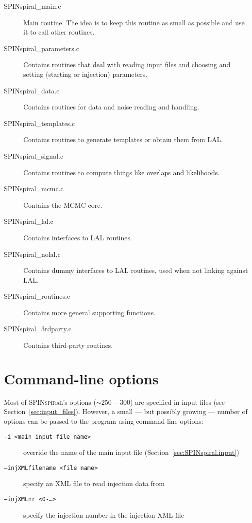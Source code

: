 \documentclass[10pt]{article}
\begin{document}
\begin{description}
\item[SPINspiral\_main.c] Main routine. The idea is to keep this routine as small as possible and use it to call other routines.
\item[SPINspiral\_parameters.c] Contains routines that deal with reading input files and choosing and setting (starting or injection) parameters.
\item[SPINspiral\_data.c] Contains routines for data and noise reading and handling.
\item[SPINspiral\_templates.c] Contains routines to generate templates or obtain them from LAL.
\item[SPINspiral\_signal.c] Contains routines to compute things like overlaps and likelihoods.
\item[SPINspiral\_mcmc.c] Contains the MCMC core.
\item[SPINspiral\_lal.c] Contains interfaces to LAL routines.
\item[SPINspiral\_nolal.c] Contains dummy interfaces to LAL routines, used when not linking against LAL.
\item[SPINspiral\_routines.c] Contains more general supporting functions.
\item[SPINspiral\_3rdparty.c] Contains third-party routines.
\end{description}





\pagebreak
\section{Command-line options}

Most of \textsc{SPINspiral}'s options ($\sim 250-300$) are specified in input files (see Section~\ref{sec:input_files}).
However, a small --- but possibly growing --- number of options can be passed to the program 
using command-line options:

\begin{description}
  \item[\texttt{-i <main input file name>}] override the name of the main input file (Section~\ref{sec:SPINspiral.input})
  \item[\texttt{--injXMLfilename <file name>}] specify an XML file to read injection data from
  \item[\texttt{--injXMLnr <0-\ldots>}] specify the injection number in the injection XML file
\end{description}
  
\end{document}
